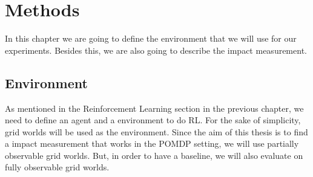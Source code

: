 \documentclass[12pt,A4]{report}
\theoremstyle{definition}
\begin{document}







\chapter{Methods}
In this chapter we are going to define the environment that we will use for our experiments. Besides this, we are also going to describe the impact measurement.

\section{Environment}
As mentioned in the Reinforcement Learning section in the previous chapter, we need to define an agent and a environment to do RL. For the sake of simplicity, grid worlds will be used as the environment. Since the aim of this thesis is to find a impact measurement that works in the POMDP setting, we will use partially observable grid worlds. But, in order to have a baseline, we will also evaluate on fully observable grid worlds. 
\end{document}
